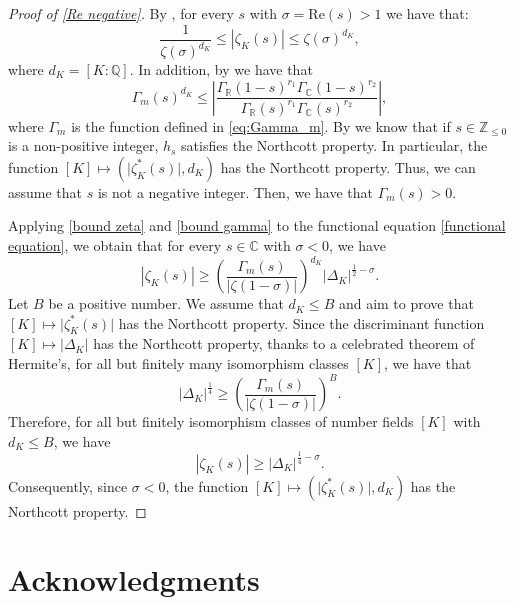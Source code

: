 \documentclass[10pt,a4paper]{amsart}
\theoremstyle{plain}
\theoremstyle{definition}
\theoremstyle{remark}
\newcommand{\Q}{\mathbb{Q}}
\newcommand{\R}{\mathbb{R}}
\newcommand{\C}{\mathbb{C}}
\begin{document}
    \begin{proof}[Proof of \cref{Re negative}]
    By \cite[Lemma 3.1]{GeLa24}, for every $s$ with $\sigma=\mathrm{Re}(s)>1$ we have that:
    \begin{equation}\label{bound zeta}
    \frac{1}{\zeta(\sigma)^{d_K}}\leq |\zeta_K(s)|\leq \zeta(\sigma)^{d_K},
    \end{equation}
    where $d_K=[K:\Q]$. In addition, by \cite[Lemma 4.3]{GeLa24} we have that
    \begin{equation}\label{bound gamma}
    \Gamma_{m}(s)^{d_K}\leq\left|\frac{\Gamma_\R(1 - s)^{r_1} \Gamma_\C(1 - s)^
{r_2}}{\Gamma_\R(s)^{r_1} \Gamma_\C(s)^{r_2}
}\right|,    
    \end{equation}
    where $\Gamma_m$ is the function defined in \eqref{eq:Gamma_m}.
    By \cite[Theorem 1.2]{Pazuki_Pengo_2024} we know that if $s \in \mathbb{Z}_{\leq 0}$ is a non-positive integer, $h_s$ satisfies the Northcott property. In particular, the function $[K]\mapsto \left(\lvert\zeta_K^\ast(s) \rvert, d_K\right)$ has the Northcott property. Thus, we can assume that $s$ is not a negative integer. Then, we have that $\Gamma_{m}(s)>0$.
    
     Applying \eqref{bound zeta} and \eqref{bound gamma} to the functional equation \eqref{functional equation}, we obtain that for every $s\in \C$ with $\sigma<0$, we have
    \[
|\zeta_K(s)|\geq \left(\frac{\Gamma_{m}(s)}{|\zeta(1-\sigma)|}\right)^{d_K}|\Delta_K|^{\frac{1}{2}-\sigma}.
    \]
    Let $B$ be a positive number. We assume that $d_K\leq B$ and aim to prove that $[K]\mapsto \lvert\zeta_K^\ast(s) \rvert$ has the Northcott property. 
    Since the discriminant function $[K]\mapsto \lvert\Delta_K \rvert$ has the Northcott property, thanks to a celebrated theorem of Hermite's, for all but finitely many isomorphism classes $[K]$, we have that
    \[
    |\Delta_K|^{\frac{1}{4}}\geq \left(\frac{\Gamma_{m}(s)}{|\zeta(1-\sigma)|}\right)^{B}.
    \]
    Therefore, for all but finitely isomorphism classes of number fields $[K]$ with $d_K\leq B$, we have
    \[
|\zeta_K(s)|\geq |\Delta_K|^{\frac{1}{4}-\sigma}.
    \]
    Consequently, since $\sigma< 0$, the function $[K]\mapsto \left(\lvert\zeta_K^\ast(s) \rvert, d_K\right)$ has the Northcott property.
    \end{proof}

    \section*{Acknowledgments}
\end{document}
